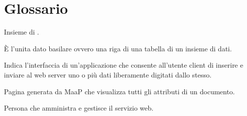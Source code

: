 \clearpage
\section{Glossario}


	Insieme di .


	\`E l'unita dato basilare ovvero una riga di una tabella di un insieme di dati.


	Indica l'interfaccia di un'applicazione che consente all'utente client di inserire e inviare al web server uno o più dati liberamente digitati dallo stesso. 


	
	Pagina generata da MaaP che visualizza tutti gli attributi di un documento.


	Persona che amministra e gestisce il servizio web.


